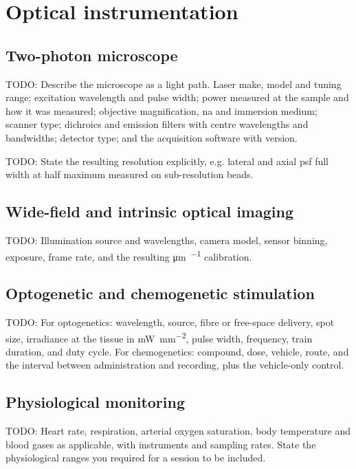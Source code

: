 	\section{Optical instrumentation}\label{section:methods:optics}

		\subsection{Two-photon microscope}

			TODO: Describe the microscope as a light path. Laser make, model
			and tuning range; excitation wavelength and pulse width; power
			measured at the sample and how it was measured; objective
			magnification, \acrshort{na} and immersion medium; scanner type;
			dichroics and emission filters with centre wavelengths and
			bandwidths; detector type; and the acquisition software with
			version.

			TODO: State the resulting resolution explicitly, e.g. lateral and
			axial \acrshort{psf} full width at half maximum measured on
			sub-resolution beads.

		\subsection{Wide-field and intrinsic optical imaging}

			TODO: Illumination source and wavelengths, camera model, sensor
			binning, exposure, frame rate, and the resulting
			\si{\micro\meter\per\pixel} calibration.

		\subsection{Optogenetic and chemogenetic stimulation}

			TODO: For optogenetics: wavelength, source, fibre or free-space
			delivery, spot size, irradiance at the tissue in
			\si{\milli\watt\per\square\milli\meter}, pulse width, frequency,
			train duration, and duty cycle. For chemogenetics: compound, dose,
			vehicle, route, and the interval between administration and
			recording, plus the vehicle-only control.

		\subsection{Physiological monitoring}

			TODO: Heart rate, respiration, arterial oxygen saturation, body
			temperature and blood gases as applicable, with instruments and
			sampling rates. State the physiological ranges you required for a
			session to be included.


